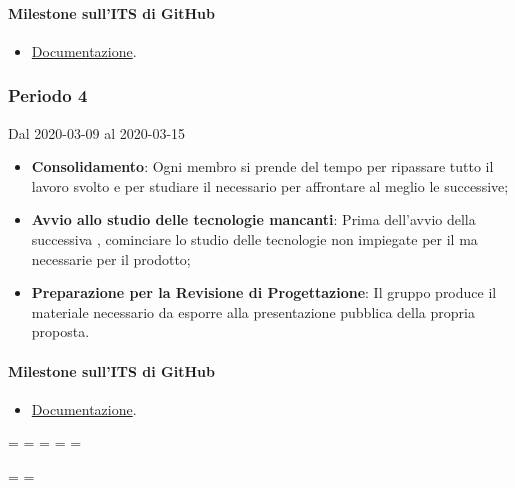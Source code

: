 \paragraph{Milestone sull'ITS di GitHub}
\begin{itemize}
	\item \href{https://github.com/qb-team/Stalker-Documentazione/milestone/10}{Documentazione}.
\end{itemize}

\subsubsection{Periodo 4} 
Dal 2020-03-09 al 2020-03-15
\begin{itemize}
	\item \textbf{Consolidamento}: Ogni membro si prende del tempo per ripassare tutto il lavoro svolto e per studiare il necessario per affrontare al meglio le  successive;
	\item \textbf{Avvio allo studio delle tecnologie mancanti}: Prima dell'avvio della successiva , cominciare lo studio delle tecnologie non impiegate per il  ma necessarie per il prodotto;
	\item \textbf{Preparazione per la Revisione di Progettazione}: Il gruppo produce il materiale necessario da esporre alla presentazione pubblica della propria proposta.
\end{itemize}
\paragraph{Milestone sull'ITS di GitHub}
\begin{itemize}
	\item \href{https://github.com/qb-team/Stalker-Documentazione/milestone/14}{Documentazione}.
\end{itemize}

\newpage
\paperwidth=\pdfpageheight
\paperheight=\pdfpagewidth
\pdfpageheight=\paperheight
\pdfpagewidth=\paperwidth
\headwidth=\textheight

\begingroup 
\vsize=\textwidth
\hsize=\textheight

